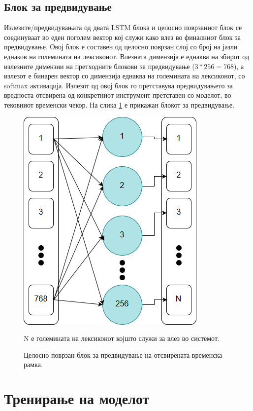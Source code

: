 \subsection{Блок за предвидување}

Излезите/предвидувањата од двата LSTM блока и целосно поврзаниот блок се соединуваат во еден поголем вектор кој служи како влез во финалниот блок за предвидување. Овој блок е составен од целосно поврзан слој со број на јазли еднаков на големината на лексиконот. Влезната димензија е еднаква на збирот од излезните димензии на претходните блокови за предвидување ($3*256=768$), а излезот е бинарен вектор со димензија еднаква на големината на лексиконот, со softmax активација. Излезот од овој блок го претставува предвидувањето за вредноста отсвирена од конкретниот инструмент претставен со моделот, во тековниот временски чекор. На слика \ref{fig:learner} е прикажан блокот за предвидување.

\begin{figure}[H]
	\centering
    \includegraphics[scale=0.5]{images/learner.png}
	\caption{Целосно поврзан блок за предвидување на отсвирената временска рамка.}
	N е големината на лексиконот којшто служи за влез во системот.
	\label{fig:learner}
\end{figure}

\newpage
\section{Тренирање на моделот}

